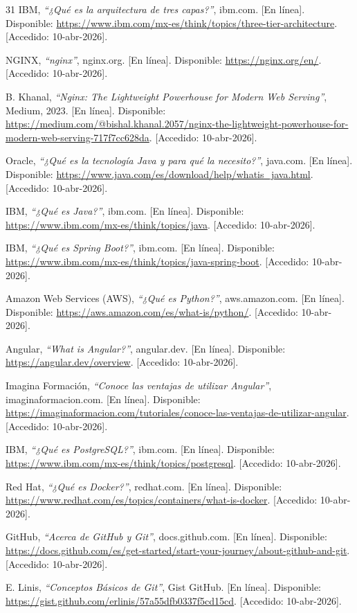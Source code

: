 \begin{thebibliography}{31}
IBM, \textit{``¿Qué es la arquitectura de tres capas?''}, ibm.com. [En línea]. Disponible: \url{https://www.ibm.com/mx-es/think/topics/three-tier-architecture}. [Accedido: 10-abr-2026].

NGINX, \textit{``nginx''}, nginx.org. [En línea]. Disponible: \url{https://nginx.org/en/}. [Accedido: 10-abr-2026].

B. Khanal, \textit{``Nginx: The Lightweight Powerhouse for Modern Web Serving''}, Medium, 2023. [En línea]. Disponible: \url{https://medium.com/@bishal.khanal.2057/nginx-the-lightweight-powerhouse-for-modern-web-serving-717f7cc628da}. [Accedido: 10-abr-2026].

Oracle, \textit{``¿Qué es la tecnología Java y para qué la necesito?''}, java.com. [En línea]. Disponible: \url{https://www.java.com/es/download/help/whatis_java.html}. [Accedido: 10-abr-2026].

IBM, \textit{``¿Qué es Java?''}, ibm.com. [En línea]. Disponible: \url{https://www.ibm.com/mx-es/think/topics/java}. [Accedido: 10-abr-2026].

IBM, \textit{``¿Qué es Spring Boot?''}, ibm.com. [En línea]. Disponible: \url{https://www.ibm.com/mx-es/think/topics/java-spring-boot}. [Accedido: 10-abr-2026].

Amazon Web Services (AWS), \textit{``¿Qué es Python?''}, aws.amazon.com. [En línea]. Disponible: \url{https://aws.amazon.com/es/what-is/python/}. [Accedido: 10-abr-2026].

Angular, \textit{``What is Angular?''}, angular.dev. [En línea]. Disponible: \url{https://angular.dev/overview}. [Accedido: 10-abr-2026].

Imagina Formación, \textit{``Conoce las ventajas de utilizar Angular''}, imaginaformacion.com. [En línea]. Disponible: \url{https://imaginaformacion.com/tutoriales/conoce-las-ventajas-de-utilizar-angular}. [Accedido: 10-abr-2026].

IBM, \textit{``¿Qué es PostgreSQL?''}, ibm.com. [En línea]. Disponible: \url{https://www.ibm.com/mx-es/think/topics/postgresql}. [Accedido: 10-abr-2026].

Red Hat, \textit{``¿Qué es Docker?''}, redhat.com. [En línea]. Disponible: \url{https://www.redhat.com/es/topics/containers/what-is-docker}. [Accedido: 10-abr-2026].

GitHub, \textit{``Acerca de GitHub y Git''}, docs.github.com. [En línea]. Disponible: \url{https://docs.github.com/es/get-started/start-your-journey/about-github-and-git}. [Accedido: 10-abr-2026].

E. Linis, \textit{``Conceptos Básicos de Git''}, Gist GitHub. [En línea]. Disponible: \url{https://gist.github.com/erlinis/57a55dfb0337f5cd15cd}. [Accedido: 10-abr-2026].

\fussy %
\end{thebibliography}